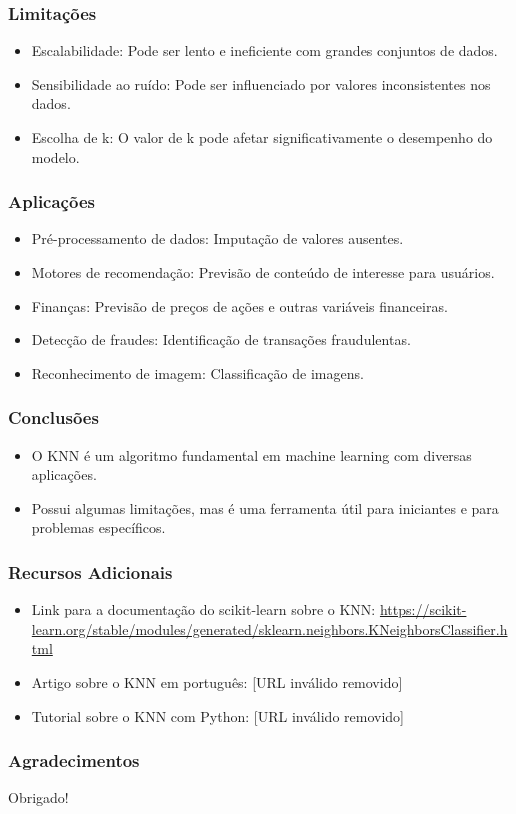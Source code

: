 \documentclass{beamer}
\begin{document}
\begin{frame}
\frametitle{Limitações}
\begin{itemize}
    \item Escalabilidade: Pode ser lento e ineficiente com grandes conjuntos de dados.
    \item Sensibilidade ao ruído: Pode ser influenciado por valores inconsistentes nos dados.
    \item Escolha de k: O valor de k pode afetar significativamente o desempenho do modelo.
\end{itemize}
\end{frame}

\begin{frame}
\frametitle{Aplicações}
\begin{itemize}
    \item Pré-processamento de dados: Imputação de valores ausentes.
    \item Motores de recomendação: Previsão de conteúdo de interesse para usuários.
    \item Finanças: Previsão de preços de ações e outras variáveis financeiras.
    \item Detecção de fraudes: Identificação de transações fraudulentas.
    \item Reconhecimento de imagem: Classificação de imagens.
\end{itemize}
\end{frame}

\begin{frame}
\frametitle{Conclusões}
\begin{itemize}
    \item O KNN é um algoritmo fundamental em machine learning com diversas aplicações.
    \item Possui algumas limitações, mas é uma ferramenta útil para iniciantes e para problemas específicos.
\end{itemize}
\end{frame}

\begin{frame}
\frametitle{Recursos Adicionais}
\begin{itemize}
    \item Link para a documentação do scikit-learn sobre o KNN: \url{https://scikit-learn.org/stable/modules/generated/sklearn.neighbors.KNeighborsClassifier.html}
    \item Artigo sobre o KNN em português: [URL inválido removido]
    \item Tutorial sobre o KNN com Python: [URL inválido removido]
\end{itemize}
\end{frame}

\begin{frame}
\frametitle{Agradecimentos}
\begin{center}
\Huge Obrigado!
\end{center}
\end{frame}
\end{document}
